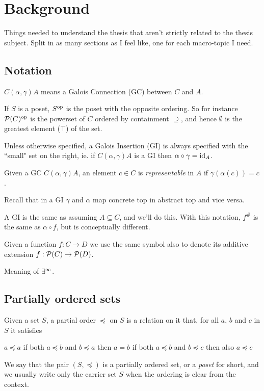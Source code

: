 \chapter{Background}

Things needed to understand the thesis that aren't strictly related to the thesis subject.
Split in as many sections as I feel like, one for each macro-topic I need.

\section{Notation}
$C (\alpha, \gamma) A$ means a Galois Connection (GC) between $C$ and $A$.

If $S$ is a poset, $S^{\text{op}}$ is the poset with the opposite ordering. So for instance $\mathcal{P}(C)^{\text{op}}$ is the powerset of $C$ ordered by containment $\supseteq$, and hence $\emptyset$ is the greatest element ($\top$) of the set.

Unless otherwise specified, a Galois Insertion (GI) is always specified with the ``small" set on the right, ie. if $C (\alpha, \gamma) A$ is a GI then $\alpha \circ \gamma = \text{id}_A$.

Given a GC $C (\alpha, \gamma) A$, an element $c \in C$ is \textit{representable} in $A$ if $\gamma(\alpha(c)) = c$.


Recall that in a GI $\gamma$ and $\alpha$ map concrete top in abstract top and vice versa.

A GI is the same as assuming $A \subseteq C$, and we'll do this. With this notation, $f^{\#}$ is the same as $\alpha \circ f$, but is conceptually different.

Given a function $f : C \rightarrow D$ we use the same symbol also to denote its additive extension $f: \mathcal{P}(C) \rightarrow \mathcal{P}(D)$.

Meaning of $\exists^{\infty}$.

\section{Partially ordered sets}
\begin{definition}
	Given a set $S$, a partial order $\preceq$ on $S$ is a relation on it that, for all $a$, $b$ and $c$ in $S$ it satisfies
	\begin{itemize}
		 $a \preceq a$
		 if both $a \preceq b$ and $b \preceq a$ then $a = b$
		 if both $a \preceq b$ and $b \preceq c$ then also $a \preceq c$
	\end{itemize}

	We say that the pair $(S, \preceq)$ is a partially ordered set, or a \textit{poset} for short, and we usually write only the carrier set $S$ when the ordering is clear from the context.
\end{definition}

